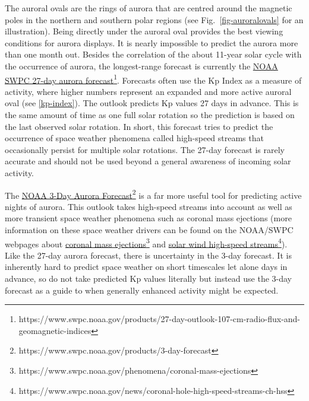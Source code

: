 \documentclass{article}
\begin{document}
The auroral ovals are the rings of aurora that are centred around the magnetic poles in the northern and southern polar regions (see Fig.~\ref{fig-auroralovals} for an illustration). Being directly under the auroral oval provides the best viewing conditions for aurora displays. It is nearly impossible to predict the aurora more than one month out. Besides the correlation of the about 11-year solar cycle with the occurrence of aurora, the longest-range forecast is currently the \href{https://www.swpc.noaa.gov/products/27-day-outlook-107-cm-radio-flux-and-geomagnetic-indices}{NOAA SWPC 27-day aurora forecast}\footnote{https://www.swpc.noaa.gov/products/27-day-outlook-107-cm-radio-flux-and-geomagnetic-indices}. Forecasts often use the Kp Index as a measure of activity, where higher numbers represent an expanded and more active auroral oval (see \ref{kp-index}). The outlook predicts Kp values 27 days in advance. This is the same amount of time as one full solar rotation so the prediction is based on the last observed solar rotation. In short, this forecast tries to predict the occurrence of space weather phenomena called high-speed streams that occasionally persist for multiple solar rotations. The 27-day forecast is rarely accurate and should not be used beyond a general awareness of incoming solar activity.

The \href{https://www.swpc.noaa.gov/products/3-day-forecast}{NOAA 3-Day Aurora Forecast}\footnote{https://www.swpc.noaa.gov/products/3-day-forecast} is a far more useful tool for predicting active nights of aurora. This outlook takes high-speed streams into account as well as more transient space weather phenomena such as coronal mass ejections (more information on these space weather drivers can be found on the NOAA/SWPC webpages about \href{https://www.swpc.noaa.gov/phenomena/coronal-mass-ejections}{coronal mass ejections}\footnote{https://www.swpc.noaa.gov/phenomena/coronal-mass-ejections} and \href{https://www.swpc.noaa.gov/news/coronal-hole-high-speed-streams-ch-hss}{solar wind high-speed streams}\footnote{https://www.swpc.noaa.gov/news/coronal-hole-high-speed-streams-ch-hss}). Like the 27-day aurora forecast, there is uncertainty in the 3-day forecast. It is inherently hard to predict space weather on short timescales let alone days in advance, so do not take predicted Kp values literally but instead use the 3-day forecast as a guide to when generally enhanced activity might be expected.
\end{document}
